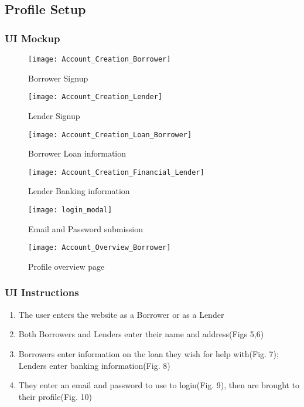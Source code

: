 \subsection{Profile Setup}

\subsubsection{UI Mockup}

\begin{figure}[H]
\centering
\texttt{[image: Account\_Creation\_Borrower]}
\caption{Borrower Signup}
\end{figure}

\begin{figure}[H]
\centering
\texttt{[image: Account\_Creation\_Lender]}
\caption{Lender Signup}
\end{figure}

\begin{figure}[H]
\centering
\texttt{[image: Account\_Creation\_Loan\_Borrower]}
\caption{Borrower Loan information}
\end{figure}

\begin{figure}[H]
\centering
\texttt{[image: Account\_Creation\_Financial\_Lender]}
\caption{Lender Banking information}
\end{figure}

\begin{figure}[H]
\centering
\texttt{[image: login\_modal]}
\caption{Email and Password submission}
\end{figure}

\begin{figure}[H]
\centering
\texttt{[image: Account\_Overview\_Borrower]}
\caption{Profile overview page}
\end{figure}


\subsubsection{UI Instructions}

\begin{enumerate}
	\item The user enters the website as a Borrower or as a Lender 
	\item Both Borrowers and Lenders enter their name and address(Figs 5,6)
	\item Borrowers enter information on the loan they wish for help with(Fig. 7); Lenders enter banking information(Fig. 8)
	\item They enter an email and password to use to login(Fig. 9), then are brought to their profile(Fig. 10)
	
\end{enumerate}